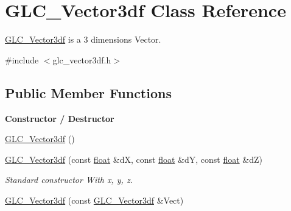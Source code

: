 \hypertarget{class_g_l_c___vector3df}{\section{G\-L\-C\-\_\-\-Vector3df Class Reference}
\label{class_g_l_c___vector3df}
}


\hyperlink{class_g_l_c___vector3df}{G\-L\-C\-\_\-\-Vector3df} is a 3 dimensions Vector.  




{\ttfamily \#include $<$glc\-\_\-vector3df.\-h$>$}

\subsection*{Public Member Functions}
\begin{Indent}{\bf Constructor / Destructor}\par
\begin{DoxyCompactItemize}
\item 
\hyperlink{class_g_l_c___vector3df_aa297e51456fb086abeb502813aa5248d}{G\-L\-C\-\_\-\-Vector3df} ()
\item 
\hyperlink{class_g_l_c___vector3df_a5db0d9280706c91836985528058896f8}{G\-L\-C\-\_\-\-Vector3df} (const \hyperlink{_super_l_u_support_8h_a6a1bb6ed41f44b60e7bd83b0e9945aa7}{float} \&d\-X, const \hyperlink{_super_l_u_support_8h_a6a1bb6ed41f44b60e7bd83b0e9945aa7}{float} \&d\-Y, const \hyperlink{_super_l_u_support_8h_a6a1bb6ed41f44b60e7bd83b0e9945aa7}{float} \&d\-Z)
\begin{DoxyCompactList}\small\item\em Standard constructor With x, y, z. \end{DoxyCompactList}\item 
\hyperlink{class_g_l_c___vector3df_a3f482834fe115078379229110f1aa896}{G\-L\-C\-\_\-\-Vector3df} (const \hyperlink{class_g_l_c___vector3df}{G\-L\-C\-\_\-\-Vector3df} \&Vect)
\end{DoxyCompactItemize}
\end{Indent}
